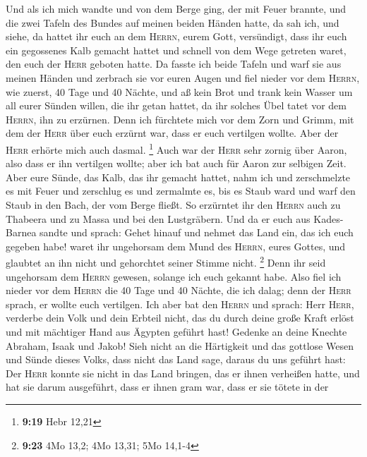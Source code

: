  Und als ich mich wandte und von dem Berge ging, der mit
Feuer brannte, und die zwei Tafeln des Bundes auf meinen beiden Händen
hatte,  da sah ich, und siehe, da hattet ihr euch an dem
\textsc{Herrn}, eurem Gott, versündigt, dass ihr euch ein gegossenes
Kalb gemacht hattet und schnell von dem Wege getreten waret, den euch
der \textsc{Herr} geboten hatte.  Da fasste ich beide
Tafeln und warf sie aus meinen Händen und zerbrach sie vor euren Augen
 und fiel nieder vor dem \textsc{Herrn}, wie zuerst, 40
Tage und 40 Nächte, und aß kein Brot und trank kein Wasser um all eurer
Sünden willen, die ihr getan hattet, da ihr solches Übel tatet vor dem
\textsc{Herrn}, ihn zu erzürnen.  Denn ich fürchtete mich
vor dem Zorn und Grimm, mit dem der \textsc{Herr} über euch erzürnt war,
dass er euch vertilgen wollte. Aber der \textsc{Herr} erhörte mich auch
dasmal. \footnote{\textbf{9:19} Hebr 12,21}  Auch war der
\textsc{Herr} sehr zornig über Aaron, also dass er ihn vertilgen wollte;
aber ich bat auch für Aaron zur selbigen Zeit.  Aber eure
Sünde, das Kalb, das ihr gemacht hattet, nahm ich und zerschmelzte es
mit Feuer und zerschlug es und zermalmte es, bis es Staub ward und warf
den Staub in den Bach, der vom Berge fließt.  So
erzürntet ihr den \textsc{Herrn} auch zu Thabeera und zu Massa und bei
den Lustgräbern.  Und da er euch aus Kades-Barnea sandte
und sprach: Gehet hinauf und nehmet das Land ein, das ich euch gegeben
habe! waret ihr ungehorsam dem Mund des \textsc{Herrn}, eures Gottes,
und glaubtet an ihn nicht und gehorchtet seiner Stimme nicht.
\footnote{\textbf{9:23} 4Mo 13,2; 4Mo 13,31; 5Mo 14,1-4} 
Denn ihr seid ungehorsam dem \textsc{Herrn} gewesen, solange ich euch
gekannt habe.  Also fiel ich nieder vor dem
\textsc{Herrn} die 40 Tage und 40 Nächte, die ich dalag; denn der
\textsc{Herr} sprach, er wollte euch vertilgen.  Ich aber
bat den \textsc{Herrn} und sprach: Herr \textsc{Herr}, verderbe dein
Volk und dein Erbteil nicht, das du durch deine große Kraft erlöst und
mit mächtiger Hand aus Ägypten geführt hast!  Gedenke an
deine Knechte Abraham, Isaak und Jakob! Sieh nicht an die Härtigkeit und
das gottlose Wesen und Sünde dieses Volks,  dass nicht
das Land sage, daraus du uns geführt hast: Der \textsc{Herr} konnte sie
nicht in das Land bringen, das er ihnen verheißen hatte, und hat sie
darum ausgeführt, dass er ihnen gram war, dass er sie tötete in der
